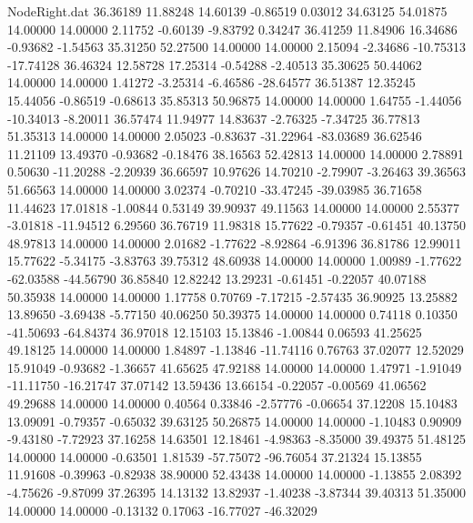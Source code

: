 \begin{filecontents}{NodeRight.dat}
  36.36189   11.88248   14.60139    -0.86519    0.03012   34.63125   54.01875   14.00000   14.00000    2.11752   -0.60139   -9.83792    0.34247
  36.41259   11.84906   16.34686    -0.93682   -1.54563   35.31250   52.27500   14.00000   14.00000    2.15094   -2.34686  -10.75313  -17.74128
  36.46324   12.58728   17.25314    -0.54288   -2.40513   35.30625   50.44062   14.00000   14.00000    1.41272   -3.25314   -6.46586  -28.64577
  36.51387   12.35245   15.44056    -0.86519   -0.68613   35.85313   50.96875   14.00000   14.00000    1.64755   -1.44056  -10.34013   -8.20011
  36.57474   11.94977   14.83637    -2.76325   -7.34725   36.77813   51.35313   14.00000   14.00000    2.05023   -0.83637  -31.22964  -83.03689
  36.62546   11.21109   13.49370    -0.93682   -0.18476   38.16563   52.42813   14.00000   14.00000    2.78891    0.50630  -11.20288   -2.20939
  36.66597   10.97626   14.70210    -2.79907   -3.26463   39.36563   51.66563   14.00000   14.00000    3.02374   -0.70210  -33.47245  -39.03985
  36.71658   11.44623   17.01818    -1.00844    0.53149   39.90937   49.11563   14.00000   14.00000    2.55377   -3.01818  -11.94512    6.29560
  36.76719   11.98318   15.77622    -0.79357   -0.61451   40.13750   48.97813   14.00000   14.00000    2.01682   -1.77622   -8.92864   -6.91396
  36.81786   12.99011   15.77622    -5.34175   -3.83763   39.75312   48.60938   14.00000   14.00000    1.00989   -1.77622  -62.03588  -44.56790
  36.85840   12.82242   13.29231    -0.61451   -0.22057   40.07188   50.35938   14.00000   14.00000    1.17758    0.70769   -7.17215   -2.57435
  36.90925   13.25882   13.89650    -3.69438   -5.77150   40.06250   50.39375   14.00000   14.00000    0.74118    0.10350  -41.50693  -64.84374
  36.97018   12.15103   15.13846    -1.00844    0.06593   41.25625   49.18125   14.00000   14.00000    1.84897   -1.13846  -11.74116    0.76763
  37.02077   12.52029   15.91049    -0.93682   -1.36657   41.65625   47.92188   14.00000   14.00000    1.47971   -1.91049  -11.11750  -16.21747
  37.07142   13.59436   13.66154    -0.22057   -0.00569   41.06562   49.29688   14.00000   14.00000    0.40564    0.33846   -2.57776   -0.06654
  37.12208   15.10483   13.09091    -0.79357   -0.65032   39.63125   50.26875   14.00000   14.00000   -1.10483    0.90909   -9.43180   -7.72923
  37.16258   14.63501   12.18461    -4.98363   -8.35000   39.49375   51.48125   14.00000   14.00000   -0.63501    1.81539  -57.75072  -96.76054
  37.21324   15.13855   11.91608    -0.39963   -0.82938   38.90000   52.43438   14.00000   14.00000   -1.13855    2.08392   -4.75626   -9.87099
  37.26395   14.13132   13.82937    -1.40238   -3.87344   39.40313   51.35000   14.00000   14.00000   -0.13132    0.17063  -16.77027  -46.32029

\end{filecontents}
